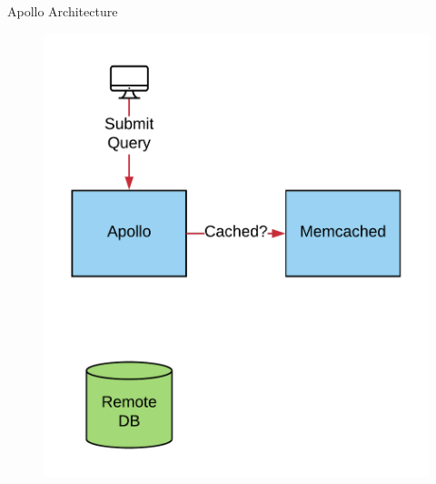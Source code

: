\documentclass[10pt]{beamer}
\begin{document}
\begin{frame}[fragile]{Apollo Architecture}
    \begin{figure}
        \includegraphics[scale=0.17]{apollo_arch_diagram_2}
    \end{figure}
\end{frame}
\end{document}
